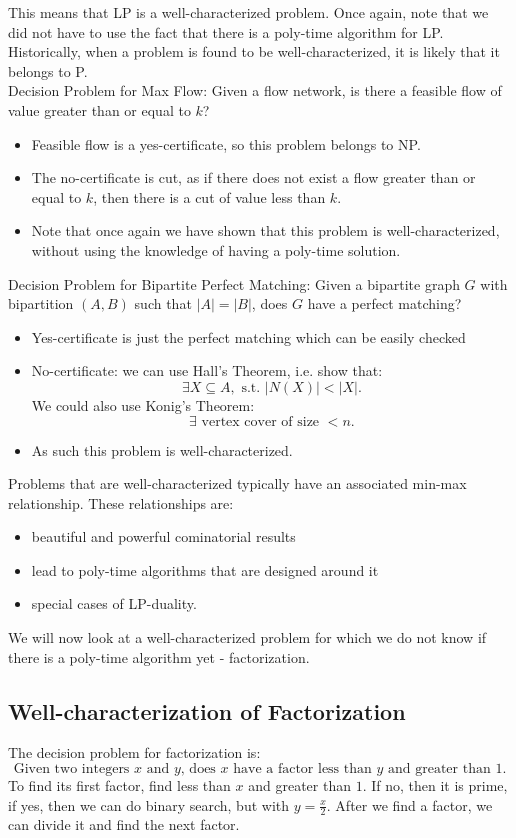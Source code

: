 \documentclass[../main/main.tex]{subfiles}
\begin{document}
This means that LP is a well-characterized problem. Once again, note that we did not have to use the fact that there is a poly-time algorithm for LP. Historically, when a problem is found to be well-characterized, it is likely that it belongs to P.\\

Decision Problem for Max Flow: Given a flow network, is there a feasible flow of value greater than or equal to $k$? 
\begin{itemize}
	\item Feasible flow is a yes-certificate, so this problem belongs to NP. 
	\item The no-certificate is cut, as if there does not exist a flow greater than or equal to $k$, then there is a cut of value less than $k$. 
	\item Note that once again we have shown that this problem is well-characterized, without using the knowledge of having a poly-time solution.
\end{itemize}

Decision Problem for Bipartite Perfect Matching: Given a bipartite graph $G$ with bipartition  $(A,B)$ such that $|A|=|B|$, does $G $ have a perfect matching?
\begin{itemize}
	\item Yes-certificate is just the perfect matching which can be easily checked
	\item No-certificate: we can use Hall's Theorem, i.e. show that: \[
			\exists X\subseteq A, \text{ s.t. }|N(X)|<|X|
	.\] We could also use Konig's Theorem: \[
	\exists \text{ vertex cover of size }<n
	.\] 
\item As such this problem is well-characterized.
\end{itemize}
Problems that are well-characterized typically have an associated min-max relationship. These relationships are: 
\begin{itemize}
	\item beautiful and powerful cominatorial results
	\item lead to poly-time algorithms that are designed around it
	\item special cases of LP-duality.
\end{itemize} 
We will now look at a well-characterized problem for which we do not know if there is a poly-time algorithm yet - factorization.
\subsection{Well-characterization of Factorization}
The decision problem for factorization is: \[\text{Given two integers $x$ and $y$, does $x$ have a factor less than $y$ and greater than $1$.}\]
To find its first factor, find less than $x$ and greater than $1$. If no, then it is prime, if yes, then we can do binary search, but with $y=\frac{x}{2}$. After we find a factor, we can divide it and find the next factor.\\
\end{document}
